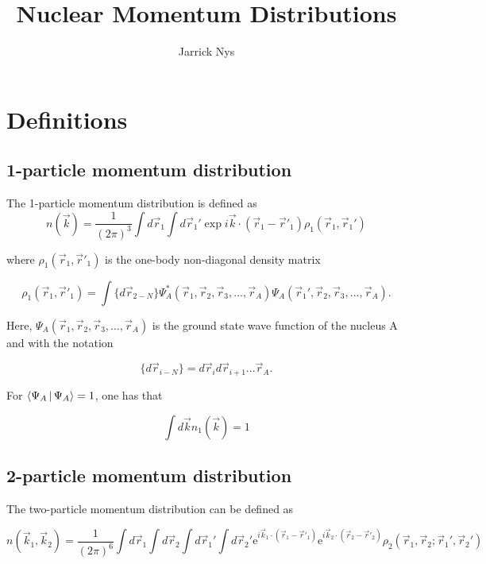 \documentclass[12pt]{article}
\title{Nuclear Momentum Distributions}
\author{Jarrick Nys}
\begin{document}
\maketitle
\section{Definitions}

\subsection{1-particle momentum distribution}

The 1-particle momentum distribution is defined as
\begin{equation}
	n(\vec{k})=\frac{1}{(2\pi)^3}\int d\vec{r}_1 \int 		    d\vec{r}_1' \exp{i\vec{k}\cdot (\vec{r}_1-\vec{r}'_1)}\rho_1(\vec{r}_1,\vec{r}_1')
\end{equation}

where $\rho_1(\vec{r}_1,\vec{r}'_1)$ is the one-body non-diagonal density matrix


\begin{equation}
\rho_1(\vec{r}_1,\vec{r}'_1) = \int \{d\vec{r}_{2-N}\} \Psi^*_A(\vec{r}_1,\vec{r}_2,\vec{r}_3, ... ,\vec{r}_A)\Psi_A(\vec{r}_1',\vec{r}_2,\vec{r}_3, ... ,\vec{r}_A).
\end{equation}



Here, $\Psi_A(\vec{r}_1,\vec{r}_2,\vec{r}_3, ... ,\vec{r}_A)$ is the ground state wave function of the nucleus A and with the notation 

\begin{equation}
\{d\vec{r}_{i-N}\}  = d\vec{r}_i d\vec{r}_{i+1}...\vec{r}_A.
\end{equation}
 


For $\Braket{\Psi_A|\Psi_A}=1$, one has that


\begin{equation}
\int d\vec{k}n_1(\vec{k})=1
\end{equation}
 



\subsection{2-particle momentum distribution}

The two-particle momentum distribution can be defined as

\begin{equation}
n(\vec{k}_1,\vec{k}_2)=\frac{1}{(2\pi)^6}\int d\vec{r}_1 \int d\vec{r}_2 \int  
    						d\vec{r}_1' \int d\vec{r}_2' 
    						\mathrm{e}^{i\vec{k}_1\cdot (\vec{r}_1-\vec{r}'_1)} 
    						\mathrm{e}^{i\vec{k}_2\cdot(\vec{r}_2-\vec{r}'_2)}
    						\rho_2(\vec{r}_1,\vec{r}_2; \vec{r}_1',\vec{r}_2')
\end{equation}
\end{document}
